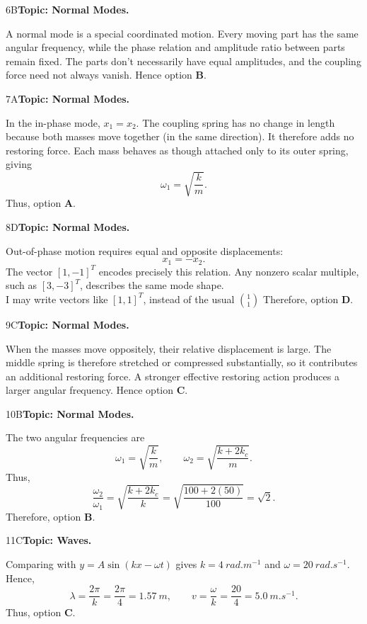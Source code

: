 \documentclass[10pt,a4paper]{physicsquiz}
\begin{document}
\begin{workedsolution}{6}{B}\textbf{Topic: Normal Modes.}\par A normal mode is a special coordinated motion. Every moving part has the same angular frequency, while the phase relation and amplitude ratio between parts remain fixed. The parts don't necessarily have equal amplitudes, and the coupling force need not always vanish. Hence option \textbf{B}.\end{workedsolution}
\begin{workedsolution}{7}{A}\textbf{Topic: Normal Modes.}\par In the in-phase mode, \(x_1=x_2\). The coupling spring has no change in length because both masses move together (in the same direction). It therefore adds no restoring force. Each mass behaves as though attached only to its outer spring, giving
  \[
    \omega_1=\sqrt{\frac{k}{m}}.
  \]
  Thus, option \textbf{A}.\end{workedsolution}
\begin{workedsolution}{8}{D}\textbf{Topic: Normal Modes.}\par Out-of-phase motion requires equal and opposite displacements:
  \[
    x_1=-x_2.
  \]
  The vector \({[1,-1]}^T\) encodes precisely this relation. Any nonzero scalar multiple, such as \({[3,-3]}^T\), describes the same mode shape.\\
  I may write vectors like \({[1, 1]}^T\), instead of the usual \({\displaystyle{\binom{1}{1}}}\) Therefore, option \textbf{D}.\end{workedsolution}
\begin{workedsolution}{9}{C}\textbf{Topic: Normal Modes.}\par When the masses move oppositely, their relative displacement is large. The middle spring is therefore stretched or compressed substantially, so it contributes an additional restoring force. A stronger effective restoring action produces a larger angular frequency. Hence option \textbf{C}.\end{workedsolution}
\begin{workedsolution}{10}{B}\textbf{Topic: Normal Modes.}\par The two angular frequencies are
  \[
    \omega_1=\sqrt{\frac{k}{m}},\qquad
    \omega_2=\sqrt{\frac{k+2k_c}{m}}.
  \]
  Thus,
  \[
    \frac{\omega_2}{\omega_1}
    =\sqrt{\frac{k+2k_c}{k}}
    =\sqrt{\frac{100+2(50)}{100}}
    =\sqrt{2}.
  \]
  Therefore, option \textbf{B}.\end{workedsolution}
\begin{workedsolution}{11}{C}\textbf{Topic: Waves.}\par Comparing with \(y=A\sin(kx-\omega t)\) gives \(k=\SI{4}{rad.m^{-1}}\) and \(\omega=\SI{20}{rad.s^{-1}}\). Hence,
  \[
    \lambda=\frac{2\pi}{k}=\frac{2\pi}{4}=\SI{1.57}{m},
    \qquad
    v=\frac{\omega}{k}=\frac{20}{4}=\SI{5.0}{m.s^{-1}}.
  \]
  Thus, option \textbf{C}.\end{workedsolution}
\end{document}
